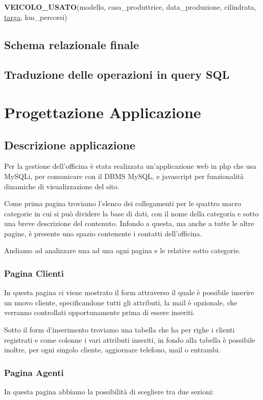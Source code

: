 \documentclass[a4paper,12pt]{report}
\begin{document}
\noindent
\textbf{VEICOLO\_USATO}(modello, casa\_produttrice, data\_produzione, cilindrata, \underline{targa}, km\_percorsi)\\

\section{Schema relazionale finale}

\section{Traduzione delle operazioni in query SQL}

\chapter{Progettazione Applicazione}

\section{Descrizione applicazione}
Per la gestione dell'officina è stata realizzata un'applicazione web in php che usa MySQLi, per  
%
comunicare con il DBMS MySQL, e javascript per funzionalità dinamiche di visualizzazione del sito.

Come prima pagina troviamo l'elenco dei collegamenti per le quattro macro categorie in cui si può dividere la base 
%
di dati, con il nome della categoria e sotto una breve descrizione del contenuto. 
%
Infondo a questa, ma anche a tutte le altre pagine, è presente uno spazio contenente i contatti dell'officina.

Andiamo ad analizzare una ad una ogni pagina e le relative sotto categorie.

\subsection*{Pagina Clienti}
In questa pagina ci viene mostrato il form attraverso il quale è possibile inserire un nuovo cliente, specificandone
%
tutti gli attributi, la mail è opzionale, che verranno controllati opportunamente prima di essere inseriti.

Sotto il form d'inserimento troviamo una tabella che ha per righe i clienti registrati e come colonne i vari attributi	
%
inseriti, in fondo alla tabella è possibile inoltre, per ogni singolo cliente, aggiornare telefono, mail o entrambi.

\subsection*{Pagina Agenti}
In questa pagina abbiamo la possibilità di scegliere tra due sezioni:
\end{document}
